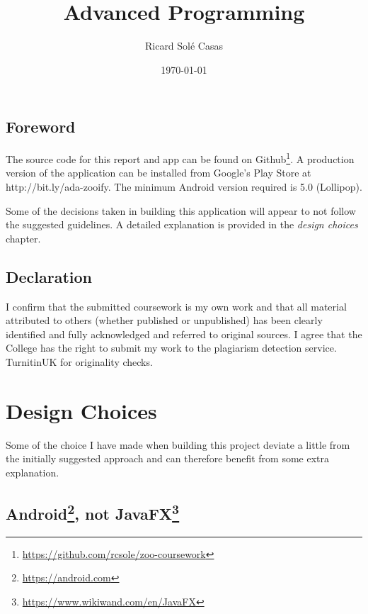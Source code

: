 \documentclass[english,a4paper,]{report}
\title{Advanced Programming}
\author{Ricard Solé Casas}
\institute{Google UK \and Ada National College for Digital Skills}
\date{\today}
\DeclareRobustCommand{\href}[2]{#2\footnote{\url{#1}}}
\begin{document}
\maketitle

\vspace*{\fill}

\section*{Foreword}

The source code for this report and app can be found on
\href{https://github.com/rcsole/zoo-coursework}{Github}. A production
version of the application can be installed from Google's Play Store at
http://bit.ly/ada-zooify. The minimum Android version required is 5.0
(Lollipop).

Some of the decisions taken in building this application will appear to
not follow the suggested guidelines. A detailed explanation is provided
in the \emph{design choices} chapter.

\section*{Declaration}

I confirm that the submitted coursework is my own work and that all
material attributed to others (whether published or unpublished) has
been clearly identified and fully acknowledged and referred to original
sources. I agree that the College has the right to submit my work to the
plagiarism detection service. TurnitinUK for originality checks.

\vspace*{\fill}

{
\setcounter{tocdepth}{2}
\tableofcontents
}
\hypertarget{design-choices}{%
\chapter{Design Choices}\label{design-choices}}

Some of the choice I have made when building this project deviate a
little from the initially suggested approach and can therefore benefit
from some extra explanation.

\hypertarget{android-not-javafx}{%
\section{\texorpdfstring{\href{https://android.com}{Android}, not
\href{https://www.wikiwand.com/en/JavaFX}{JavaFX}}{Android, not JavaFX}}\label{android-not-javafx}}
\end{document}

